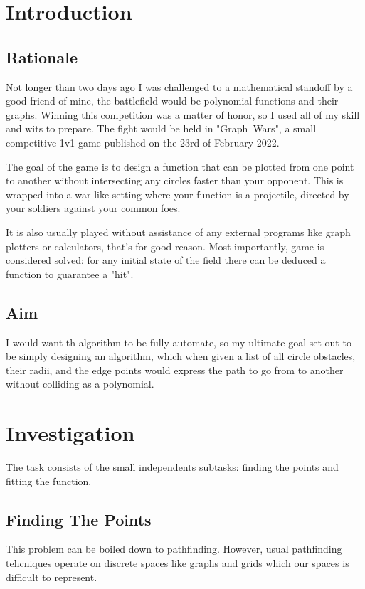 \documentclass[12pt, titlepage]{article}
\title{}
\author{Artur Roos}
\date{October 2022}
\begin{document}
\maketitle
\tableofcontents

\section{Introduction}
\subsection{Rationale}
Not longer than two days ago I was challenged to a mathematical standoff by a 
good friend of mine, the battlefield would be polynomial functions and their 
graphs. Winning this competition was a matter of honor, so I used all of my 
skill and wits to prepare. The fight would be held in \mbox{"Graph Wars"}, a 
small competitive 1v1 game published on the 23rd of February 2022. 

The goal of the game is to design a function that can be plotted from one point
to another without intersecting any circles faster than your opponent. This
is wrapped into a war-like setting where your function is a projectile, directed
by your soldiers against your common foes.

It is also usually played without assistance of any external programs like 
graph plotters or calculators, that's for good reason. Most importantly, game is
considered solved: for any initial state of the field there can be deduced a 
function to guarantee a "hit". 

\subsection{Aim}
I would want th algorithm to be fully automate, so my ultimate goal 
set out to be simply designing an algorithm, which when given a list of all
circle obstacles, their radii, and the edge points would express the path to
go from to another without colliding as a polynomial.

\section{Investigation}
The task consists of the small independents subtasks: finding the points and 
fitting the function. 

\subsection{Finding The Points}
This problem can be boiled down to pathfinding. However, usual pathfinding
tehcniques operate on discrete spaces like graphs and grids which our spaces
is difficult to represent.
\end{document}
